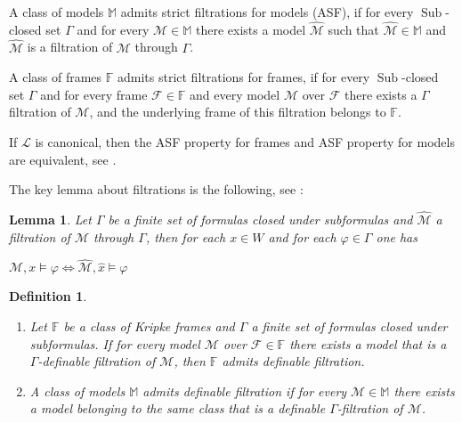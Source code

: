 \documentclass[a4paper]{article}
\theoremstyle{defin}
\newtheorem{defin}{Definition}
\theoremstyle{theorem}
\theoremstyle{prop}
\theoremstyle{lemma}
\newtheorem{lemma}{Lemma}
\theoremstyle{fact}
\theoremstyle{exercise}
\theoremstyle{ex}
\theoremstyle{col}
\theoremstyle{claim}
\begin{document}
A class of models $\mathbb{M}$ admits strict filtrations for models (ASF), if for every $\operatorname{Sub}$-closed set $\Gamma$ and for every $\mathcal{M} \in \mathbb{M}$ there exists a model $\widehat{\mathcal{M}}$ such that $\widehat{\mathcal{M}} \in \mathbb{M}$ and $\widehat{\mathcal{M}}$ is a filtration of $\mathcal{M}$ through $\Gamma$.

A class of frames $\mathbb{F}$ admits strict filtrations for frames, if for every $\operatorname{Sub}$-closed set $\Gamma$ and for every frame $\mathcal{F} \in \mathbb{F}$ and every model $\mathcal{M}$ over $\mathcal{F}$ there exists a $\Gamma$ filtration of $\mathcal{M}$, and the underlying frame of this filtration belongs to $\mathbb{F}$.

If $\mathcal{L}$ is canonical, then the ASF property for frames and ASF property for models are equivalent, see \cite[Theorem 2.10]{kikot2020completeness}.

The key lemma about filtrations is the following, see \cite[Theorem 2.39]{blackburn_rijke_venema_2001}:

\begin{lemma}
  Let $\Gamma$ be a finite set of formulas closed under subformulas and $\widehat{\mathcal{M}}$ a filtration of $\mathcal{M}$ through $\Gamma$, then for each $x \in W$ and for each $\varphi \in \Gamma$ one has
  \begin{center}
    $\mathcal{M}, x \models \varphi \Leftrightarrow \widehat{\mathcal{M}}, \hat{x} \models \varphi$
  \end{center}
\end{lemma}

\begin{defin}
$ $

  \begin{enumerate}
    \item Let $\mathbb{F}$ be a class of Kripke frames and $\Gamma$ a finite set of formulas closed under subformulas. If for every model $\mathcal{M}$ over $\mathcal{F} \in \mathbb{F}$ there exists a model that is a $\Gamma$-definable filtration of $\mathcal{M}$, then $\mathbb{F}$ admits definable filtration.

    \item A class of models $\mathbb{M}$ admits definable filtration if for every $\mathcal{M} \in \mathbb{M}$ there exists a model belonging to the same class that is a definable $\Gamma$-filtration of $\mathcal{M}$.
  \end{enumerate}
\end{defin}
\end{document}
